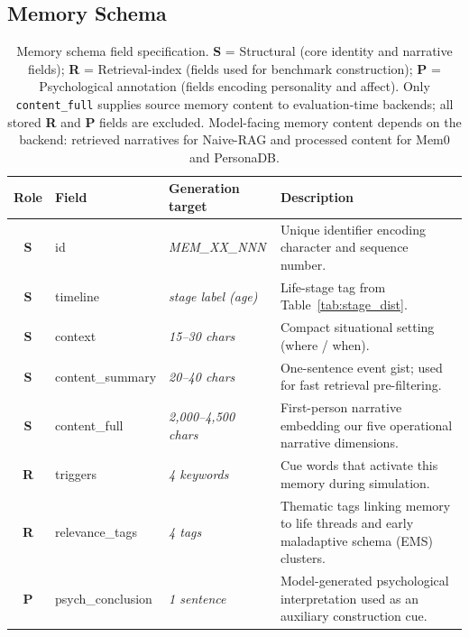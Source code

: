 \documentclass[11pt]{article}
\begin{document}
\subsection{Memory Schema}
\label{app:schema}

\begin{table}[!t]
\centering
\caption{Memory schema field specification. \textbf{S} = Structural (core identity and narrative fields); \textbf{R} = Retrieval-index (fields used for benchmark construction); \textbf{P} = Psychological annotation (fields encoding personality and affect). Only \texttt{content\_full} supplies source memory content to evaluation-time backends; all stored \textbf{R} and \textbf{P} fields are excluded. Model-facing memory content depends on the backend: retrieved narratives for Naive-RAG and processed content for Mem0 and PersonaDB.}
\label{tab:schema}
\small
\setlength{\tabcolsep}{5pt}
\renewcommand{\arraystretch}{1.25}
\begin{tabular}{>{\bfseries}cp{2.8cm}p{3.2cm}p{6.0cm}}
\toprule
\textbf{Role} & \textbf{Field} & \textbf{Generation target} & \textbf{Description} \\
\midrule
\rowcolor{blue!8}
S & id               & \textit{MEM\_XX\_NNN}          & Unique identifier encoding character and sequence number. \\
\rowcolor{blue!8}
S & timeline         & \textit{stage label (age)}     & Life-stage tag from Table~\ref{tab:stage_dist}. \\
\rowcolor{blue!8}
S & context          & \textit{15--30 chars}          & Compact situational setting (where / when). \\
\rowcolor{blue!8}
S & content\_summary & \textit{20--40 chars}          & One-sentence event gist; used for fast retrieval pre-filtering. \\
\rowcolor{blue!8}
S & content\_full    & \textit{2{,}000--4{,}500 chars}    & First-person narrative embedding our five operational narrative dimensions. \\
\midrule
\rowcolor{green!8}
R & triggers         & \textit{4 keywords}            & Cue words that activate this memory during simulation. \\
\rowcolor{green!8}
R & relevance\_tags  & \textit{4 tags}                & Thematic tags linking memory to life threads and early maladaptive schema (EMS) clusters. \\
\midrule
\rowcolor{orange!8}
P & psych\_conclusion  & \textit{1 sentence}          & Model-generated psychological interpretation used as an auxiliary construction cue. \\

\end{tabular}
\end{table}
\end{document}
